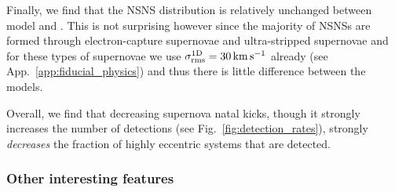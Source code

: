 Finally, we find that the NSNS distribution is relatively unchanged between model \modFid{} and \modSigLower{}. This is not surprising however since the majority of NSNSs are formed through electron-capture supernovae and ultra-stripped supernovae and for these types of supernovae we use $\sigma^{\rm 1D}_{\rm rms} = 30 \unit{km}{s^{-1}}$ already (see App.~\ref{app:fiducial_physics}) and thus there is little difference between the models.

Overall, we find that decreasing supernova natal kicks, though it strongly increases the number of detections (see Fig.~\ref{fig:detection_rates}), strongly \textit{decreases} the fraction of highly eccentric systems that are detected.

\subsubsection{Other interesting features}


